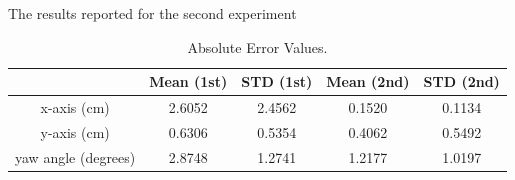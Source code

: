 The results reported for the second experiment 



\begin{table}[ht]
\renewcommand{\arraystretch}{1.3}
\caption{Absolute Error Values.}
\label{absolute}
\centering
\begin{tabular}{|c||c||c||c||c|}
\hline
  & Mean (1st)& STD (1st) &  Mean (2nd)& STD (2nd) \\
\hline
x-axis (cm) & 2.6052 & 2.4562 & 0.1520 & 0.1134\\
\hline
y-axis (cm) & 0.6306 & 0.5354 & 0.4062 & 0.5492\\
\hline
yaw angle (degrees)& 2.8748 & 1.2741 & 1.2177 & 1.0197\\
\hline
\hline
\end{tabular}
\end{table}

